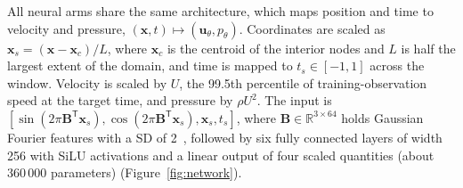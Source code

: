 \documentclass[12pt,a4paper]{article}
\newcommand{\SD}{\ac{SD}\xspace}
\theoremstyle{definition}
\numberwithin{equation}{section}
\begin{document}
All neural arms share the same architecture, which maps position and time to velocity and pressure, $(\mathbf x,t)\mapsto(\mathbf u_\theta,p_\theta)$. Coordinates are scaled as $\mathbf x_s=(\mathbf x-\mathbf x_c)/L$, where $\mathbf x_c$ is the centroid of the interior nodes and $L$ is half the largest extent of the domain, and time is mapped to $t_s\in[-1,1]$ across the window. Velocity is scaled by $U$, the 99.5th percentile of training-observation speed at the target time, and pressure by $\rho U^2$. The input is $[\sin(2\pi\mathbf B^{\mathsf T}\mathbf x_s),\cos(2\pi\mathbf B^{\mathsf T}\mathbf x_s),\mathbf x_s,t_s]$, where $\mathbf B\in\mathbb R^{3\times64}$ holds Gaussian Fourier features with a \SD of 2~\cite{tancik2020fourier}, followed by six fully connected layers of width 256 with SiLU activations and a linear output of four scaled quantities (about 360\,000 parameters) (Figure~\ref{fig:network}).
\end{document}
